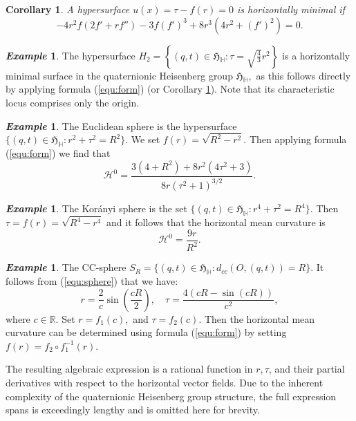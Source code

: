 \documentclass [12pt,a4paper]{amsart}
\newcommand{\calH}{\mathcal{H}}
\newcommand{\R}{\mathbb{R}}
\newcommand{\mH}{\mathbb{H}}
\newcommand{\frakH}{\mathfrak{H}}
\theoremstyle{plain}
\newtheorem{cor}[thm]{Corollary}
\theoremstyle{definition}
\newtheorem{eg}[]{\emph{Example}}
\numberwithin{equation}{section}
\begin{document}
\begin{cor}\label{cor-0}
A hypersurface $u(x)=\tau-f(r)=0$ is horizontally minimal if
$$
-4r^2f(2f'+rf'')-3f(f')^3+8r^3(4r^2+(f')^2)=0.
$$
\end{cor}
\begin{eg}
The hypersurface $H_2=\left\{(q, t)\in\frakH_\mH: \tau=\sqrt{\frac{4}{3}}r^2\right\}$ is a horizontally minimal surface in the quaternionic Heisenberg group $\frakH_\mH,$  as this follows directly by applying formula (\ref{equ:form}) (or Corollary \ref{cor-0}). Note that its characteristic locus comprises only the origin.
\end{eg}
\begin{eg}
The Euclidean sphere is the hypersurface  $\{(q, t)\in\frakH_\mH: r^2+\tau^2=R^2\}.$
We set $f(r)=\sqrt{R^2-r^2}.$ Then applying formula (\ref{equ:form}) we find that
$$
\calH^0=\frac{3(4+R^2)+8r^2(4\tau^2+3)}{8r(\tau^2+1)^{3/2}}.
$$
\end{eg}
\begin{eg}
The Korányi sphere is the set $\{(q, t)\in\frakH_\mH: r^4+\tau^2=R^4\}.$ Then
 $\tau=f(r)=\sqrt{R^4-r^4}$ and it follows that
the horizontal mean curvature is
$$
\calH^0=\frac{9r}{R^2}.
$$
\end{eg}
\begin{eg}
The CC-sphere $S_R=\{(q, t)\in\frakH_\mH: d_{cc}(O, (q, t))=R \}.$ 
It follows from (\ref{equ:sphere}) that we have:
\[
r=\frac{2}{c}\sin\left(\frac{cR}{2}\right), \quad \tau=\frac{4(cR-\sin(cR))}{c^2},
\]
where $c\in \R.$ Set $r=f_1(c),$ and $\tau=f_2(c).$ Then the horizontal mean curvature can be determined using formula (\ref{equ:form}) by setting $f(r)=f_2\circ f_1^{-1}(r).$ 

The resulting algebraic expression is a rational function in $r, \tau$, and their partial derivatives with respect to the horizontal vector fields. Due to the inherent complexity of the quaternionic Heisenberg group structure, the full expression spans is exceedingly lengthy and is omitted here for brevity.
\end{eg}
\end{document}
